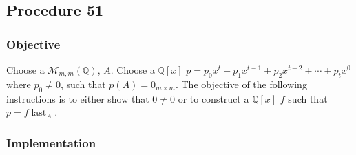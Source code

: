 \documentclass[twocolumn]{article}
\DeclareMathOperator{\last}{last}
\begin{document}
		\subsection{Procedure 51}\label{sec:procedure 51}
			\subsubsection{Objective}
				Choose a $\mathcal{M}_{m,m}(\mathbb{Q})$, $A$. Choose a $\mathbb{Q}[x]$ $p=p_0x^t+p_1x^{t-1}+p_2x^{t-2}+\cdots+p_tx^0$ where $p_0\ne 0$, such that $p(A)=0_{m\times m}$. The objective of the following instructions is to either show that $0\ne 0$ or to construct a $\mathbb{Q}[x]$ $f$ such that $p=f\last_A$.
			\subsubsection{Implementation}
\end{document}
